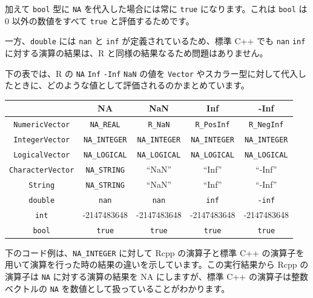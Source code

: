 \documentclass[]{book}
\begin{document}
加えて \texttt{bool} 型に \texttt{NA} を代入した場合には常に \texttt{true} になります。これは \texttt{bool} は 0 以外の数値をすべて \texttt{true} と評価するためです。

一方、\texttt{double} には \texttt{nan} と \texttt{inf} が定義されているため、標準 C++ でも \texttt{nan} \texttt{inf} に対する演算の結果は、R と同様の結果なるため問題はありません。

下の表では、R の \texttt{NA} \texttt{Inf} \texttt{-Inf} \texttt{NaN} の値を \texttt{Vector} やスカラー型に対して代入したときに、どのような値として評価されるのかまとめています。

\begin{longtable}[]{@{}ccccc@{}}
\toprule
& NA & NaN & Inf & -Inf\tabularnewline
\midrule
\endhead
\texttt{NumericVector} & \texttt{NA\_REAL} & \texttt{R\_NaN} & \texttt{R\_PosInf} & \texttt{R\_NegInf}\tabularnewline
\texttt{IntegerVector} & \texttt{NA\_INTEGER} & \texttt{NA\_INTEGER} & \texttt{NA\_INTEGER} & \texttt{NA\_INTEGER}\tabularnewline
\texttt{LogicalVector} & \texttt{NA\_LOGICAL} & \texttt{NA\_LOGICAL} & \texttt{NA\_LOGICAL} & \texttt{NA\_LOGICAL}\tabularnewline
\texttt{CharacterVector} & \texttt{NA\_STRING} & ``NaN'' & ``Inf'' & ``-Inf''\tabularnewline
\texttt{String} & \texttt{NA\_STRING} & ``NaN'' & ``Inf'' & ``-Inf''\tabularnewline
\texttt{double} & \texttt{nan} & \texttt{nan} & \texttt{inf} & \texttt{-inf}\tabularnewline
\texttt{int} & -2147483648 & -2147483648 & -2147483648 & -2147483648\tabularnewline
\texttt{bool} & \texttt{true} & \texttt{true} & \texttt{true} & \texttt{true}\tabularnewline
\bottomrule
\end{longtable}

下のコード例は、\texttt{NA\_INTEGER} に対して Rcpp の演算子と標準 C++ の演算子を用いて演算を行った時の結果の違いを示しています。この実行結果から Rcpp の演算子は \texttt{NA} に対する演算の結果を NA にしますが、標準 C++ の演算子は整数ベクトルの \texttt{NA} を数値として扱っていることがわかります。
\end{document}
